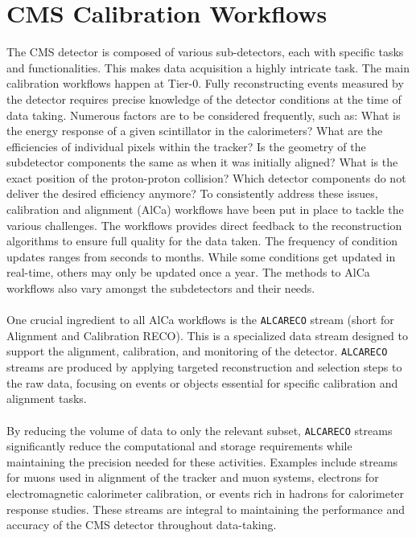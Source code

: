 
\section{CMS Calibration Workflows}\label{sec:CMScalibration}
The CMS detector is composed of various sub-detectors, each with specific tasks and functionalities. This makes data acquisition a highly intricate task. The main calibration workflows happen at Tier-0. Fully reconstructing events measured by the detector requires precise knowledge of the detector conditions at the time of data taking. Numerous factors are to be considered frequently, such as: What is the energy response of a given scintillator in the calorimeters? What are the efficiencies of individual pixels within the tracker? Is the geometry of the subdetector components the same as when it was initially aligned?
What is the exact position of the proton-proton collision? Which detector components do not deliver the desired efficiency anymore? To consistently address these issues, calibration and alignment (AlCa) workflows have been put in place to tackle the various challenges. The workflows provides direct feedback to the reconstruction algorithms to ensure full quality for the data taken. The frequency of condition updates ranges from seconds to months. While some conditions get updated in real-time, others may only be updated once a year. The methods to AlCa workflows also vary amongst the subdetectors and their needs. \\ \\
One crucial ingredient to all AlCa workflows is the \texttt{ALCARECO} stream (short for Alignment and Calibration RECO).
This is a specialized data stream designed to support the alignment, calibration, and monitoring of the detector. \texttt{ALCARECO} streams are produced by applying targeted reconstruction and selection steps to the raw data, focusing on events or objects essential for specific calibration and alignment tasks.\\ \\
By reducing the volume of data to only the relevant subset, \texttt{ALCARECO} streams significantly reduce the computational and storage requirements while maintaining the precision needed for these activities. Examples include streams for muons used in alignment of the tracker and muon systems, electrons for electromagnetic calorimeter calibration, or events rich in hadrons for calorimeter response studies. These streams are integral to maintaining the performance and accuracy of the CMS detector throughout data-taking.\\ \\
